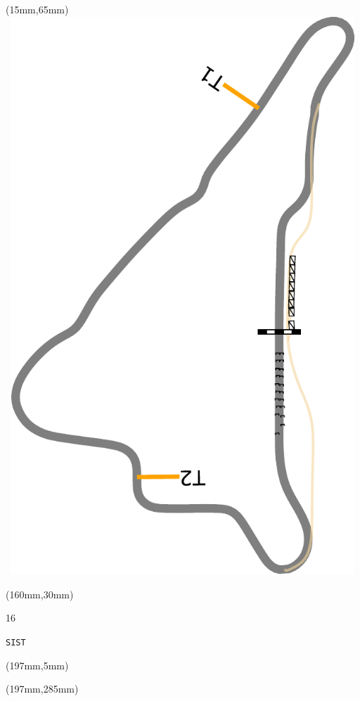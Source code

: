 \begin{textblock*}{185mm}(15mm,65mm)%
\centering
\mbox{\includegraphics[width=185mm,height=210mm,keepaspectratio]{PT/SIST.pdf}}
\end{textblock*}
\begin{textblock*}{40mm}(160mm,30mm)%
\Large
\par{} 
\par16 
\par\hfill\tiny\tt SIST\\
\end{textblock*}
\begin{textblock*}{20mm}(197mm,5mm)%
\fbox{\thepage}
\label{SIST}
\end{textblock*}
\begin{textblock*}{20mm}(197mm,285mm)%
\fbox{\thepage}
\end{textblock*}

